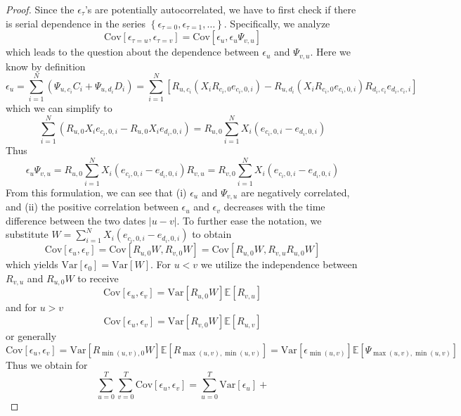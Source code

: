 \begin{proof}
	Since the $\epsilon_{\tau}$'s are potentially autocorrelated, we have to first check if there is serial dependence in the series $\left\{ \epsilon_{\tau=0}, \epsilon_{\tau=1}, \dots  \right\}$.
	Specifically, we analyze
	\[
	\mathrm{Cov} \left[  \epsilon_{\tau=u}, \epsilon_{\tau=v} \right]
	=
	\mathrm{Cov} \left[  \epsilon_{u}, \epsilon_{u} \Psi_{v,u} \right]
	\]
	which leads to the question about the dependence between $\epsilon_{u}$ and $\Psi_{v,u}$.
	Here we know by definition
	\[
	\epsilon_{u} 
	= 
	\sum_{i=1}^N \left( \Psi_{u,c_i} C_i + \Psi_{u,d_i} D_i \right)
	=
	\sum_{i=1}^N 
	\left[
	R_{u,c_i} \left( X_i R_{c_i,0} e_{c_i,0,i} \right) - R_{u,d_i} \left( X_i R_{c_i,0} e_{c_i,0,i} \right) R_{d_i,c_i} e_{d_i,c_i,i}
	\right]
	\]
	which we can simplify to
	\[
	\sum_{i=1}^N \left( R_{u,0} X_i e_{c_i,0,i} - R_{u,0} X_i e_{d_i,0,i} \right)
	=
	R_{u,0} \sum_{i=1}^N X_i \left( e_{c_i,0,i} - e_{d_i,0,i} \right)
	\]
	Thus
	\[
	\epsilon_{u} \Psi_{v,u} =
	R_{u,0} \sum_{i=1}^N X_i \left( e_{c_i,0,i} - e_{d_i,0,i} \right) R_{v,u} =
	R_{v,0} \sum_{i=1}^N X_i \left( e_{c_i,0,i} - e_{d_i,0,i} \right)
	\]
	From this formulation, we can see that (i) $\epsilon_{u}$ and $\Psi_{v,u}$ are negatively correlated, and (ii) the positive correlation between $\epsilon_{u}$ and $\epsilon_{v}$ decreases with the time difference between the two dates $| u - v |$.
	To further ease the notation, we substitute $W = \sum_{i=1}^N X_i \left( e_{c_i,0,i} - e_{d_i,0,i} \right)$ to obtain
	\[
	\mathrm{Cov} \left[  \epsilon_{u}, \epsilon_{v} \right] =
	\mathrm{Cov} \left[ R_{u,0} W, R_{v,0} W \right] =
	\mathrm{Cov} \left[ R_{u,0} W, R_{v,u} R_{u,0} W \right]
	\]
	which yields $\mathrm{Var} \left[  \epsilon_{0} \right] = \mathrm{Var} \left[  W \right]$.
	For $u<v$ we utilize the independence between $R_{v,u}$ and $R_{u,0} W$ to receive
	\[
	\mathrm{Cov} \left[  \epsilon_{u}, \epsilon_{v} \right] =
	\mathrm{Var} \left[ R_{u,0} W \right] \mathbb{E} \left[ R_{v,u} \right]
	\]
	and for $u>v$
	\[
	\mathrm{Cov} \left[  \epsilon_{u}, \epsilon_{v} \right] =
	\mathrm{Var} \left[ R_{v,0} W \right] \mathbb{E} \left[ R_{u,v} \right]
	\]
	or generally
	\[
	\mathrm{Cov} \left[  \epsilon_{u}, \epsilon_{v} \right] =
	\mathrm{Var} \left[ R_{\min(u,v),0} W \right] \mathbb{E} \left[ R_{\max(u,v),\min(u,v)} \right] =
	\mathrm{Var} \left[ \epsilon_{\min(u,v)} \right] \mathbb{E} \left[ \Psi_{\max(u,v),\min(u,v)} \right]
	\]
	Thus we obtain for
	\[
	\sum_{u=0}^T \sum_{v=0}^T \mathrm{Cov} \left[  \epsilon_{u}, \epsilon_{v} \right] =
	\sum_{u=0}^T \mathrm{Var} \left[  \epsilon_{u} \right] + 
\]
\end{proof}
